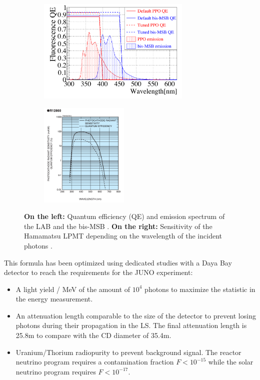 \documentclass[../main.tex]{subfiles}
\begin{document}
\begin{figure}[ht]
  \centering
  \begin{subfigure}[b]{0.48\textwidth}
    \centering
    \includegraphics[height=5cm]{images/juno/LS_spectrum.png}
  \end{subfigure}
  \hfill
  \begin{subfigure}[b]{0.48\textwidth}
    \centering
    \includegraphics[height=5cm]{images/juno/LPMT_efficiency.png}
  \end{subfigure}
  \caption{\textbf{On the left:} Quantum efficiency (QE) and emission spectrum of the LAB and the bis-MSB \cite{bay_optimization_2020}. \textbf{On the right:} Sensitivity of the Hamamatsu LPMT depending on the wavelength of the incident photons \cite{noauthor_photomultiplier_nodate}.}
  \label{fig:juno:LS_spectrum_and_PMT_sensitivity}
\end{figure}

This formula has been optimized using dedicated studies with a Daya Bay detector \cite{bay_optimization_2020, zhang_complete_2020} to reach the requirements for the JUNO experiment:
\begin{itemize}
  \item A light yield / MeV of the amount of $10^4$ photons to maximize the statistic in the energy measurement.
  \item An attenuation length comparable to the size of the detector to prevent losing photons during their propagation in the LS. The final attenuation length is 25.8m \cite{yang_light_2017} to compare with the CD diameter of 35.4m.
  \item Uranium/Thorium radiopurity to prevent background signal. The reactor neutrino program requires a contamination fraction $F<10^{-15}$ while the solar neutrino program requires $F<10^{-17}$.
\end{itemize}
\end{document}
